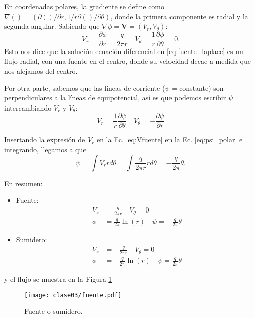 En coordenadas polares, la gradiente se define como $\nabla()=(\partial()/\partial r,1/r\partial()/\partial\theta)$, donde la primera componente es radial y la segunda angular.
Sabiendo que $\nabla\phi=\mathbf{V}=(V_r,V_\theta)$:
%
\begin{equation}\label{eq:Vfuente}
V_r = \frac{\partial\phi}{\partial r} = \frac{q}{2\pi r}\quad V_\theta= \frac{1}{r}\frac{\partial\phi}{\partial\theta}=0.
\end{equation}
%
Esto nos dice que la solución ecuación diferencial en \eqref{eq:fuente_laplace} es un flujo radial, con una fuente en el centro, donde su velocidad decae a medida que nos alejamos del centro.

Por otra parte, sabemos que las líneas de corriente ($\psi=$constante) son perpendiculares a la líneas de equipotencial, así es que podemos escribir $\psi$ intercambiando $V_r$ y $V_\theta$:
\begin{equation}\label{eq:psi_polar}
V_r=\frac{1}{r}\frac{\partial\psi}{\partial\theta} \quad V_\theta=-\frac{\partial\psi}{\partial r}
\end{equation}

Insertando la expresión de $V_r$ en la Ec. \eqref{eq:Vfuente} en la Ec. \eqref{eq:psi_polar} e integrando, llegamos a que
%
\begin{equation}
\psi = \int V_rr d\theta = \int\frac{q}{2\pi r} rd\theta = -\frac{q}{2\pi}\theta. 
\end{equation}

En resumen:
\begin{itemize}
\item Fuente:
\begin{align}
V_r &= \frac{q}{2\pi r}\quad V_\theta=0\nonumber\\
\phi&=\frac{q}{2\pi}\ln(r) \quad \psi=-\frac{q}{2\pi}\theta
\end{align}
\item Sumidero:
\begin{align}
V_r &= -\frac{q}{2\pi r}\quad V_\theta=0\nonumber\\
\phi&=-\frac{q}{2\pi}\ln(r) \quad \psi=\frac{q}{2\pi}\theta
\end{align}
\end{itemize}
%
y el flujo se muestra en la Figura \ref{fig:fuente}
%
\begin{figure}[h!]
\centering
\texttt{[image: clase03/fuente.pdf]}
\caption{Fuente o sumidero.}
\label{fig:fuente}
\end{figure}

